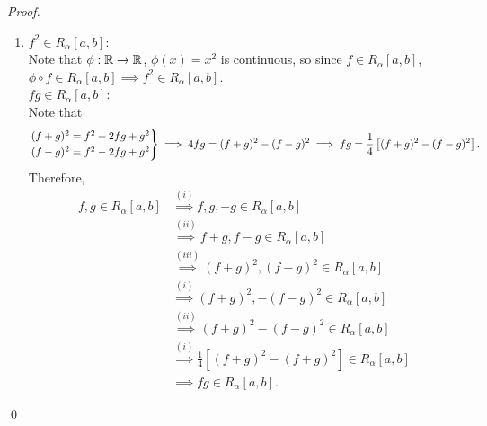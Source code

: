 \begin{proof}
\begin{enumerate}
\begin{align*}
        \end{align*}
        By the squeeze theorem,
        $$\lim_{n \to \infty}\left[U(f+g, \alpha, P_n \cup Q_n) - L(f+g, \alpha, P_n \cup Q_n)\right] = 0.$$
        Moreover,
        \begin{align*}
            \int_a^bf+g d\alpha &= \lim_{n\to \infty}\left[U(f+g, \alpha, P_n \cup Q_n)\right] \\
            &\leq \lim_{n \to \infty} \left[U(f, \alpha, P_n) + U(g, \alpha, P_n)\right] = \int_a^b fd \alpha + \int_a^b gd\alpha \\
            \int_a^bf+g d\alpha &= \lim_{n\to \infty}\left[L(f+g, \alpha, P_n \cup Q_n)\right] \\
            &\geq \lim_{n \to \infty} \left[L(f, \alpha, P_n) + L(g, \alpha, P_n)\right] = \int_a^b fd \alpha + \int_a^b gd\alpha.
        \end{align*}
        This implies $\int_a^b f+g d\alpha = \int_a^b fd\alpha + \int_a^b gd\alpha.$

        \item $f^2 \in R_\alpha[a,b]:$ \\
        Note that $\phi: \mathbb{R} \to \mathbb{R}$, $\phi(x) = x^2$ is continuous, so since $f \in R_\alpha[a,b]$, $\phi \circ f \in R_\alpha[a,b] \implies f^2 \in R_\alpha[a,b].$ \\
        $fg \in R_\alpha[a,b]:$ \\
        Note that
        $$\begin{rcases*}
            (f+g)^2 = f^2+2fg+g^2 \\
            (f-g)^2 = f^2 -2fg + g^2
        \end{rcases*}\implies 4fg = (f+g)^2 - (f-g)^2 \implies fg = \frac{1}{4}\left[(f+g)^2-(f-g)^2\right].$$
        Therefore,
        \begin{align*}
            f,g \in R_\alpha[a,b] &\overset{(i)}{\implies} f,g, -g \in R_\alpha[a,b] \\
            &\overset{(ii)}{\implies} f+g, f-g \in R_\alpha[a,b] \\
            &\overset{(iii)}{\implies} (f+g)^2, (f-g)^2 \in R_\alpha[a,b] \\
            &\overset{(i)}{\implies} (f+g)^2, -(f-g)^2 \in R_\alpha[a,b] \\
            &\overset{(ii)}{\implies} (f+g)^2-(f-g)^2 \in R_\alpha[a,b] \\
            &\overset{(i)}{\implies} \frac{1}{4}\left[(f+g)^2 - (f+g)^2\right] \in R_\alpha[a,b] \\
            &\implies fg \in R_\alpha[a,b].
        \end{align*}
    \end{enumerate}
    \qed
\end{proof}

